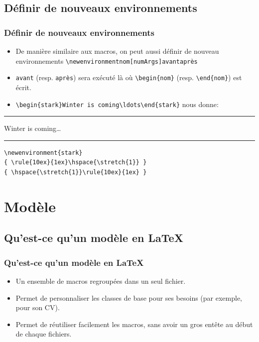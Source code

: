 \documentclass{clic_latex_beamer}
\newenvironment{stark}
{ \rule{10ex}{1ex}\hspace{\stretch{1}} }
{ \hspace{\stretch{1}}\rule{10ex}{1ex} }
\begin{document}
 \subsection{Définir de nouveaux environnements}
 \begin{frame}[fragile]
\frametitle{Définir de nouveaux environnements}
\begin{itemize}
\item De manière similaire aux macros, on peut aussi définir de nouveau environnements \texttt{\textbackslash newenvironment{nom}[numArgs]{avant}{après}}
\item \texttt{avant} (resp. \texttt{après}) sera exécuté là où  \texttt{\textbackslash begin\{nom\}} (resp.  \texttt{\textbackslash end\{nom\}}) est écrit.
\item \texttt{\small\textbackslash begin\{stark\}Winter is coming\textbackslash ldots\textbackslash end\{stark\}} nous donne:
\end{itemize}
\begin{stark}Winter is coming\ldots\end{stark}
\begin{lstlisting}
\newenvironment{stark}
{ \rule{10ex}{1ex}\hspace{\stretch{1}} }
{ \hspace{\stretch{1}}\rule{10ex}{1ex} }
\end{lstlisting}
\end{frame}
 

\section{Modèle}
 \subsection{Qu'est-ce qu'un modèle en \LaTeX}
\begin{frame}
\frametitle{Qu'est-ce qu'un modèle en \LaTeX}
\begin{itemize}
\item Un ensemble de macros regroupées dans un seul fichier.
\item Permet de personnaliser les classes de base pour ses besoins (par exemple, pour son CV).
\item Permet de réutiliser facilement les macros, sans avoir un gros entête au début de chaque fichiers. 
\end{itemize}
 \end{frame}
 
\end{document}
